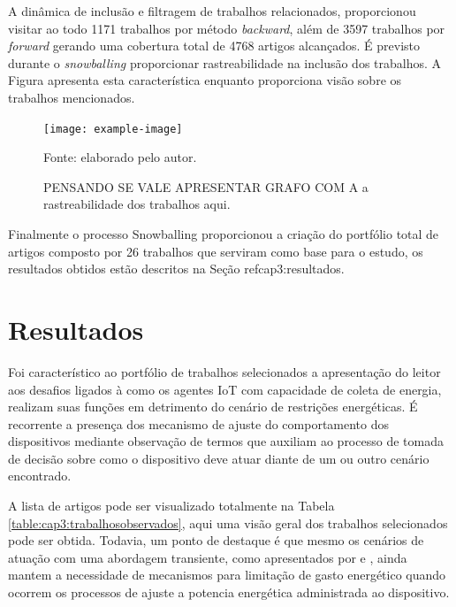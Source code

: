 A dinâmica de inclusão e filtragem de trabalhos relacionados, proporcionou visitar ao todo 1171 trabalhos por método \textit{backward}, além de 3597 trabalhos por \textit{forward} gerando uma cobertura total de 4768 artigos alcançados. É previsto durante o \textit{snowballing} proporcionar rastreabilidade na inclusão dos trabalhos. A Figura apresenta esta característica enquanto proporciona visão sobre os trabalhos mencionados. 

\begin{figure}[H]
	\centering	
	\caption{PENSANDO SE VALE APRESENTAR GRAFO COM A a rastreabilidade dos trabalhos aqui.} 
	\label{fig:cap3etapassnowballing}
	\noindent\texttt{[image: example-image]} 
	
	Fonte: elaborado pelo autor.
\end{figure}

Finalmente o processo Snowballing proporcionou a criação do portfólio total de artigos composto por 26 trabalhos que serviram como base para o estudo, os resultados obtidos estão descritos na Seção ref{cap3:resultados}.


\section{Resultados}
\label{cap3:resultados}

Foi característico ao portfólio de trabalhos selecionados a apresentação do leitor aos desafios ligados à como os agentes \acs{IoT} com capacidade de coleta de energia, realizam suas funções em detrimento do cenário de restrições energéticas. É recorrente a presença dos mecanismo de ajuste do comportamento dos dispositivos mediante observação de termos que auxiliam ao processo de tomada de decisão sobre como o dispositivo deve atuar diante de um ou outro cenário encontrado.

A lista de artigos pode ser visualizado totalmente na Tabela \ref{table:cap3:trabalhosobservados}, aqui uma visão geral dos trabalhos selecionados pode ser obtida. Todavia, um ponto de destaque é que mesmo os cenários de atuação com uma abordagem transiente, como apresentados por  e , ainda mantem a necessidade de mecanismos para limitação de gasto energético quando ocorrem os processos de ajuste a potencia energética administrada ao dispositivo. 



